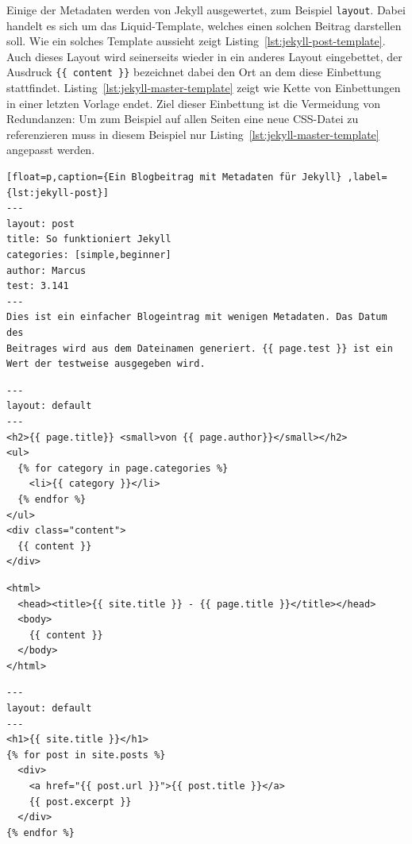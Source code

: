 Einige der Metadaten werden von Jekyll ausgewertet, zum Beispiel \lstinline{layout}. Dabei handelt es sich um das Liquid-Template, welches einen solchen Beitrag darstellen soll. Wie ein solches Template aussieht zeigt Listing~\ref{lst:jekyll-post-template}. Auch dieses Layout wird seinerseits wieder in ein anderes Layout eingebettet, der Ausdruck \lstinline|{{ content }}| bezeichnet dabei den Ort an dem diese Einbettung stattfindet. Listing~\ref{lst:jekyll-master-template} zeigt wie Kette von Einbettungen in einer letzten Vorlage endet. Ziel dieser Einbettung ist die Vermeidung von Redundanzen: Um zum Beispiel auf allen Seiten eine neue CSS-Datei zu referenzieren muss in diesem Beispiel nur Listing~\ref{lst:jekyll-master-template} angepasst werden.

\begin{lstlisting}[float=p,caption={Ein Blogbeitrag mit Metadaten für Jekyll} ,label={lst:jekyll-post}]
---
layout: post
title: So funktioniert Jekyll
categories: [simple,beginner]
author: Marcus
test: 3.141
---
Dies ist ein einfacher Blogeintrag mit wenigen Metadaten. Das Datum des
Beitrages wird aus dem Dateinamen generiert. {{ page.test }} ist ein
Wert der testweise ausgegeben wird.
\end{lstlisting}

\begin{lstlisting}[float=p,caption={Beispieltemplate für Blogbeiträge für Jekyll}, label={lst:jekyll-post-template}]
---
layout: default
---
<h2>{{ page.title}} <small>von {{ page.author}}</small></h2>
<ul>
  {% for category in page.categories %}
    <li>{{ category }}</li>
  {% endfor %}
</ul>
<div class="content">
  {{ content }}
</div>
\end{lstlisting}

\begin{lstlisting}[float=p,caption={Template mit HTML-Rumpf für Jekyll}, label={lst:jekyll-master-template}]
<html>
  <head><title>{{ site.title }} - {{ page.title }}</title></head>
  <body>
    {{ content }}
  </body>
</html>
\end{lstlisting}

\begin{lstlisting}[float=p,caption={Hauptseite mit Auszügen aller Beiträge für Jekyll}, label={lst:jekyll-main-page}]
---
layout: default
---
<h1>{{ site.title }}</h1>
{% for post in site.posts %}
  <div>
    <a href="{{ post.url }}">{{ post.title }}</a>
    {{ post.excerpt }}
  </div>
{% endfor %}
\end{lstlisting}

